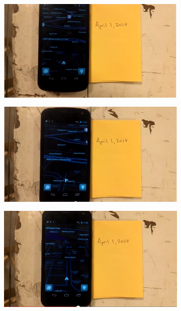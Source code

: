 \begin{figure}[t]
\begin{subfigure}[t]{0.33\textwidth}
\includegraphics[width=\textwidth]{./figures/apps/waze/waze1.png}
\caption{}
\end{subfigure}%
\begin{subfigure}[t]{0.33\textwidth}
\includegraphics[width=\textwidth]{./figures/apps/waze/waze2.png}
\caption{}
\end{subfigure}%
\begin{subfigure}[t]{0.33\textwidth}
\includegraphics[width=\textwidth]{./figures/apps/waze/waze3.png}
\caption{}
\end{subfigure}%


\end{figure}
